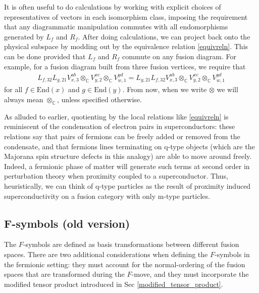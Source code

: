 \documentclass[12pt,a4paper]{article}
\newcommand{\tp}{\otimes}
\newcommand{\cc}{\mathbb{C}}
\begin{document}
It is often useful to do calculations 
by working with explicit choices of representatives of vectors in each isomorphism class, imposing the requirement that any diagrammatic manipulation commutes with all endomorphisms generated by $L_f$ and $R_f$. 
After doing calculations, we can project back onto the physical subspace by modding out by the equivalence relation \eqref{equivreln}. 
This can be done provided that $L_f$ and $R_f$ commute on any fusion diagram. For example, for a fusion diagram built from three fusion vertices, we require that
\begin{align}
L_{f, 32}L_{g,21} V^{ab}_{x,3} \tp_{\mathbb{C}} V^{xc}_{y,2} \tp_{\mathbb{C}} V^{yd}_{w,1} = L_{g,21} L_{f, 32} V^{ab}_{x,3} \tp_{\mathbb{C}} V^{xc}_{y,2} \tp_{\mathbb{C}} V^{yd}_{w,1} 
\end{align}
for all $f \in \text{End}(x)$ and $g \in \text{End}(y)$. 
From now, when we write $\tp$ we will always mean $\tp_\cc$, unless specified otherwise.




As alluded to earlier, quotienting by the local relations like \eqref{equivreln} is reminiscent of the 
condensation of electron pairs in superconductors: these relations say that pairs of fermions can be freely 
added or removed from the condensate, and that fermions lines terminating on q-type objects (which are 
the Majorana spin structure defects in this analogy) are able to move around freely. 
Indeed, a fermionic phase of matter will generate such terms at second order in perturbation theory when 
proximity coupled to a superconductor.
Thus, heuristically, we can think of q-type particles as the result of proximity induced superconductivity on 
a fusion category with only m-type particles.


\subsection{F-symbols (old version)}

The $F$-symbols are defined as basis transformations between different fusion spaces. 
There are two additional considerations when defining the $F$-symbols in the fermionic setting: they must account for the normal-ordering of the fusion spaces that are transformed during the $F$-move, and they must incorporate the modified tensor product introduced in Sec \ref{modified_tensor_product}. 
\end{document}
